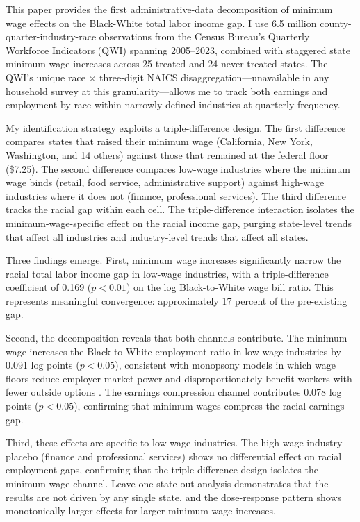 \documentclass[12pt]{article}
\begin{document}
This paper provides the first administrative-data decomposition of minimum wage effects on the Black-White total labor income gap. I use 6.5 million county-quarter-industry-race observations from the Census Bureau's Quarterly Workforce Indicators (QWI) spanning 2005--2023, combined with staggered state minimum wage increases across 25 treated and 24 never-treated states. The QWI's unique race $\times$ three-digit NAICS disaggregation---unavailable in any household survey at this granularity---allows me to track both earnings and employment by race within narrowly defined industries at quarterly frequency.

My identification strategy exploits a triple-difference design. The first difference compares states that raised their minimum wage (California, New York, Washington, and 14 others) against those that remained at the federal floor (\$7.25). The second difference compares low-wage industries where the minimum wage binds (retail, food service, administrative support) against high-wage industries where it does not (finance, professional services). The third difference tracks the racial gap within each cell. The triple-difference interaction isolates the minimum-wage-specific effect on the racial income gap, purging state-level trends that affect all industries and industry-level trends that affect all states.

Three findings emerge. First, minimum wage increases significantly narrow the racial total labor income gap in low-wage industries, with a triple-difference coefficient of 0.169 ($p < 0.01$) on the log Black-to-White wage bill ratio. This represents meaningful convergence: approximately 17 percent of the pre-existing gap.

Second, the decomposition reveals that both channels contribute. The minimum wage increases the Black-to-White employment ratio in low-wage industries by 0.091 log points ($p < 0.05$), consistent with monopsony models in which wage floors reduce employer market power and disproportionately benefit workers with fewer outside options \citep{ManningBook2003, AzarEtAl2019}. The earnings compression channel contributes 0.078 log points ($p < 0.05$), confirming that minimum wages compress the racial earnings gap.

Third, these effects are specific to low-wage industries. The high-wage industry placebo (finance and professional services) shows no differential effect on racial employment gaps, confirming that the triple-difference design isolates the minimum-wage channel. Leave-one-state-out analysis demonstrates that the results are not driven by any single state, and the dose-response pattern shows monotonically larger effects for larger minimum wage increases.
\end{document}
